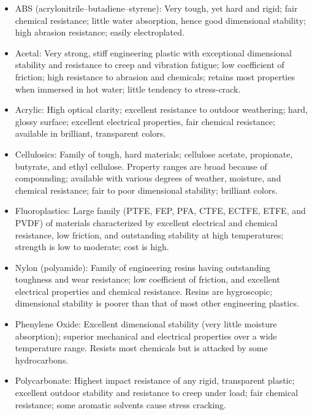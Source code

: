 \documentclass[
10pt,
a4paper,
openany,
svgnames,
]{book}
\begin{document}
\begin{itemize}[label=\scriptsize$\square$]

\item ABS (acrylonitrile–butadiene–styrene): Very tough, yet hard and rigid; fair chemical resistance; little water absorption, hence good dimensional stability; high abrasion resistance; easily electroplated.

\item Acetal: Very strong, stiff engineering plastic with exceptional dimensional stability and resistance to creep and vibration fatigue; low coefficient of friction; high resistance to abrasion and chemicals; retains most properties when immersed in hot water; little tendency to stress-crack.

\item Acrylic: High optical clarity; excellent resistance to outdoor weathering; hard, glossy surface; excellent electrical properties, fair chemical resistance; available in brilliant, transparent colors.

\item Cellulosics: Family of tough, hard materials; cellulose acetate, propionate, butyrate, and ethyl cellulose. Property ranges are broad because of compounding; available with various degrees of weather, moisture, and chemical resistance; fair to poor dimensional stability; brilliant colors.

\item Fluoroplastics: Large family (PTFE, FEP, PFA, CTFE, ECTFE, ETFE, and PVDF) of materials characterized by excellent electrical and chemical resistance, low friction, and outstanding stability at high temperatures; strength is low to moderate; cost is high.

\item Nylon (polyamide): Family of engineering resins having outstanding toughness and wear resistance; low coefficient of friction, and excellent electrical properties and chemical resistance. Resins are hygroscopic; dimensional stability is poorer than that of most other engineering plastics. 

\item Phenylene Oxide: Excellent dimensional stability (very little moisture absorption); superior mechanical and electrical properties over a wide temperature range. Resists most chemicals but is attacked by some hydrocarbons.

\item Polycarbonate: Highest impact resistance of any rigid, transparent plastic; excellent outdoor stability and resistance to creep under load; fair chemical resistance; some aromatic solvents cause stress cracking.


\end{itemize}
\end{document}
